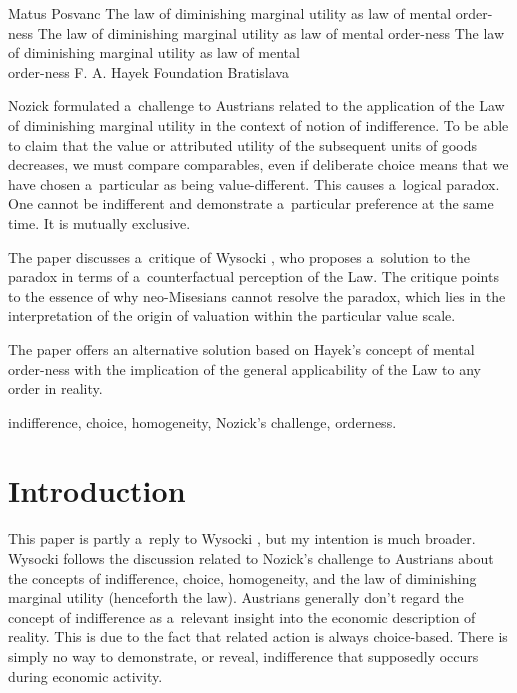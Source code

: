 \begin{artengenv}{Matus Posvanc}
	{The law of diminishing marginal utility as law of mental order-ness}
	{The law of diminishing marginal utility as law of mental order-ness}
	{The law of diminishing marginal utility as law of mental\\order-ness}
	{F. A. Hayek Foundation Bratislava\label{posvanc-first}}
	{Nozick 
	\parencite*[][]{Nozick1977On} %
	 formulated a~challenge to Austrians related to the application of the Law of diminishing marginal utility in the context of notion of indifference. To be able to claim that the value or attributed utility of the subsequent units of goods decreases, we must compare comparables, even if deliberate choice means that we have chosen a~particular as being value-different. This causes a~logical paradox. One cannot be indifferent and demonstrate a~particular preference at the same time. It is mutually exclusive.
	 
	 The paper discusses a~critique of Wysocki 
	 \parencite*[][]{Wysocki2021problem}, %
	  who proposes a~solution to the paradox in terms of a~counterfactual perception of the Law. The critique points to the essence of why neo-Misesians cannot resolve the paradox, which lies in the interpretation of the origin of valuation within the particular value scale. 
	 
	 The paper offers an alternative solution based on Hayek's concept of mental order-ness with the implication of the general applicability of the Law to any order in reality.
	}
	{indifference, choice, homogeneity, Nozick's challenge, orderness.}



\renewcommand{\figurename}{Illustration}

\section{Introduction}



\lettrine[loversize=0.13,lines=2,lraise=-0.03,nindent=0em,findent=0.2pt]%
{T}{}his paper is partly a~reply to Wysocki 
\parencite*[][]{Wysocki2021problem}, %
 but my intention is much broader. Wysocki follows the discussion related to Nozick's 
\parencite*[][]{Nozick1977On} %
 challenge to Austrians about the concepts of indifference, choice, homogeneity, and the law of diminishing marginal utility (henceforth the law). Austrians generally don't regard the concept of indifference as a~relevant insight into the economic description of reality. This is due to the fact that related action is always choice-based. There is simply no way to demonstrate, or reveal, indifference that supposedly occurs during economic activity.




\end{artengenv}
